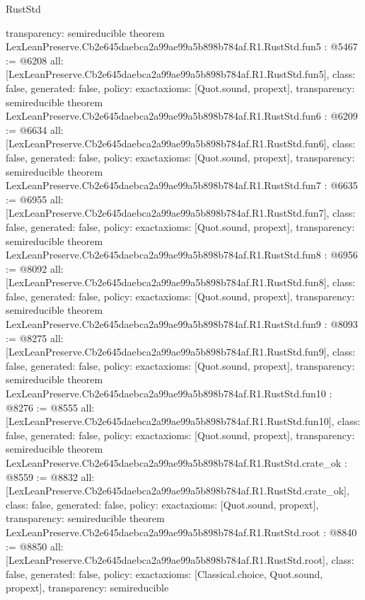 \begin{lexlean}{RustStd}
\begin{coremodule}
{  transparency: semireducible
}
theorem LexLeanPreserve.Cb2e645daebca2a99ae99a5b898b784af.R1.RustStd.fun5 : @5467 := @6208 {
  all: [LexLeanPreserve.Cb2e645daebca2a99ae99a5b898b784af.R1.RustStd.fun5],
  class: false,
  generated: false,
  policy: exact{axioms: [Quot.sound, propext]},
  transparency: semireducible
}
theorem LexLeanPreserve.Cb2e645daebca2a99ae99a5b898b784af.R1.RustStd.fun6 : @6209 := @6634 {
  all: [LexLeanPreserve.Cb2e645daebca2a99ae99a5b898b784af.R1.RustStd.fun6],
  class: false,
  generated: false,
  policy: exact{axioms: [Quot.sound, propext]},
  transparency: semireducible
}
theorem LexLeanPreserve.Cb2e645daebca2a99ae99a5b898b784af.R1.RustStd.fun7 : @6635 := @6955 {
  all: [LexLeanPreserve.Cb2e645daebca2a99ae99a5b898b784af.R1.RustStd.fun7],
  class: false,
  generated: false,
  policy: exact{axioms: [Quot.sound, propext]},
  transparency: semireducible
}
theorem LexLeanPreserve.Cb2e645daebca2a99ae99a5b898b784af.R1.RustStd.fun8 : @6956 := @8092 {
  all: [LexLeanPreserve.Cb2e645daebca2a99ae99a5b898b784af.R1.RustStd.fun8],
  class: false,
  generated: false,
  policy: exact{axioms: [Quot.sound, propext]},
  transparency: semireducible
}
theorem LexLeanPreserve.Cb2e645daebca2a99ae99a5b898b784af.R1.RustStd.fun9 : @8093 := @8275 {
  all: [LexLeanPreserve.Cb2e645daebca2a99ae99a5b898b784af.R1.RustStd.fun9],
  class: false,
  generated: false,
  policy: exact{axioms: [Quot.sound, propext]},
  transparency: semireducible
}
theorem LexLeanPreserve.Cb2e645daebca2a99ae99a5b898b784af.R1.RustStd.fun10 : @8276 := @8555 {
  all: [LexLeanPreserve.Cb2e645daebca2a99ae99a5b898b784af.R1.RustStd.fun10],
  class: false,
  generated: false,
  policy: exact{axioms: [Quot.sound, propext]},
  transparency: semireducible
}
theorem LexLeanPreserve.Cb2e645daebca2a99ae99a5b898b784af.R1.RustStd.crate_ok : @8559 := @8832 {
  all: [LexLeanPreserve.Cb2e645daebca2a99ae99a5b898b784af.R1.RustStd.crate_ok],
  class: false,
  generated: false,
  policy: exact{axioms: [Quot.sound, propext]},
  transparency: semireducible
}
theorem LexLeanPreserve.Cb2e645daebca2a99ae99a5b898b784af.R1.RustStd.root : @8840 := @8850 {
  all: [LexLeanPreserve.Cb2e645daebca2a99ae99a5b898b784af.R1.RustStd.root],
  class: false,
  generated: false,
  policy: exact{axioms: [Classical.choice, Quot.sound, propext]},
  transparency: semireducible
}


\end{coremodule}
\end{lexlean}
